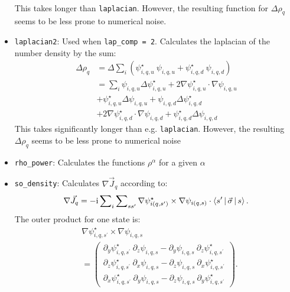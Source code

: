\documentclass[3p]{elsarticle}
\begin{document}
\begin{itemize}
\begin{align}
\end{align}     
This takes longer than \texttt{laplacian}. However, the resulting function for $\Delta \rho_q$ seems to be less prone to numerical noise.
\item \texttt{laplacian2}: Used when \texttt{lap\_comp = 2}. Calculates the laplacian of the number density by the sum:
\begin{align}
\Delta \rho_q &= \Delta \sum\nolimits_i \left( \psi^{\star}_{i,q,u} \: \psi_{i,q,u} +  \psi^{\star}_{i,q,d} \: \psi_{i,q,d} \right) \\
&= \sum\nolimits_i   \psi_{i,q,u}  \Delta \psi^{\star}_{i,q,u} + 2 \nabla \psi^{\star}_{i,q,u} \cdot \nabla \psi_{i,q,u} \nonumber\\
                      &+ \psi^{\star}_{i,q,u}  \Delta \psi_{i,q,u} + \psi_{i,q,d}  \Delta \psi^{\star}_{i,q,d}  \nonumber\\
                      &+ 2 \nabla \psi^{\star}_{i,q,d} \cdot \nabla \psi_{i,q,d} + \psi^{\star}_{i,q,d}   \Delta \psi_{i,q,d}
\end{align}
This takes significantly longer than e.g. \texttt{laplacian}. However, the resulting $\Delta \rho_q$ seems to be less prone to numerical noise
\item \texttt{rho\_power}: Calculates the functions $\rho^\alpha$ for a given $\alpha$
\item \texttt{so\_density}: Calculates $\nabla \vec{J}_q$ according to:
\begin{align}
\nabla \vec{J}_q = -\mathrm{i} \sum\nolimits_i \sum\nolimits_{s s^\prime} \nabla \psi_{i(q,s^\prime)}^\star \times \nabla \psi_{i(q,s)} \cdot \Braket{ s^\prime  | \vec{\sigma} | s} .
\label{divJ}
\end{align}
The outer product for one state is:
\begin{align}
&\nabla \psi_{i,q,s^\prime}^\star \times \nabla \psi_{i,q,s} \nonumber\\
&= 
 \begin{pmatrix}
  \partial_y \psi_{i,q,s^\prime}^\star \: \partial_z \psi_{i,q,s} - \partial_y \psi_{i,q,s} \: \partial_z \psi_{i,q,s^\prime}^\star  \\
  \partial_z \psi_{i,q,s^\prime}^\star \: \partial_x \psi_{i,q,s} - \partial_z \psi_{i,q,s} \: \partial_x \psi_{i,q,s^\prime}^\star  \\
  \partial_x \psi_{i,q,s^\prime}^\star \: \partial_y \psi_{i,q,s} - \partial_z \psi_{i,q,s} \: \partial_y \psi_{i,q,s^\prime}^\star 
 \end{pmatrix}.

\end{align}
\end{itemize}
\end{document}
